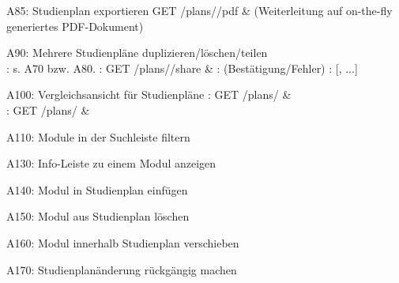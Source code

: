 \begin{restusecase}{A85: Studienplan exportieren}
	GET /plans//pdf
	& (Weiterleitung auf on-the-fly generiertes PDF-Dokument)
\end{restusecase}

\begin{restusecase}{A90: Mehrere Studienpläne duplizieren/löschen/teilen}
	 \\
	\hline
	: s. A70 bzw. A80. \newline
	: \newline
	GET /plans//share
	& : (Bestätigung/Fehler) \newline
	: [, ...]
\end{restusecase}

\begin{restusecase}{A100: Vergleichsansicht für Studienpläne}
	: GET /plans/
	&  \\
	\hline
	: GET /plans/
	& 
\end{restusecase}

\begin{restusecase}{A110: Module in der Suchleiste filtern}
	
\end{restusecase}

\begin{restusecase}{A130: Info-Leiste zu einem Modul anzeigen}
	
\end{restusecase}

\begin{restusecase}{A140: Modul in Studienplan einfügen}
	
\end{restusecase}

\begin{restusecase}{A150: Modul aus Studienplan löschen}
	
\end{restusecase}

\begin{restusecase}{A160: Modul innerhalb Studienplan verschieben}
	
\end{restusecase}

\begin{restusecase}{A170: Studienplanänderung rückgängig machen}
	
\end{restusecase}

